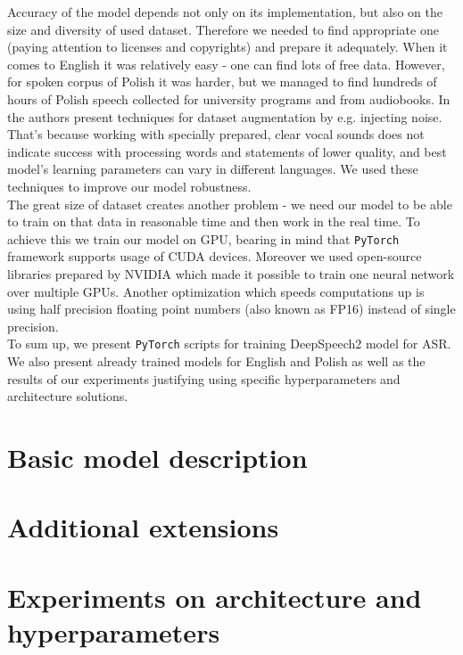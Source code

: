 \documentclass[11pt,a4paper]{article}
\begin{document}
Accuracy of the model depends not only on its implementation, but also on the size and diversity of used dataset. Therefore we needed to find appropriate one (paying attention to licenses and copyrights) and prepare it adequately. When it comes to English it was relatively easy - one can find lots of free data. However, for spoken corpus of Polish it was harder, but we managed to find hundreds of hours of Polish speech collected for university programs and from audiobooks. In \cite{DS1} the authors present techniques for dataset augmentation by e.g. injecting noise. That's because working with specially prepared, clear vocal sounds does not indicate success with processing words and statements of lower quality, and best model's learning parameters can vary in different languages. We used these techniques to improve our model robustness.\\

The great size of dataset creates another problem - we need our model to be able to train on that data in reasonable time and then work in the real time. To achieve this we train our model on GPU, bearing in mind that \texttt{PyTorch} framework supports usage of CUDA devices. Moreover we used open-source libraries prepared by NVIDIA which made it possible to train one neural network over multiple GPUs. Another optimization which speeds computations up is using half precision floating point numbers (also known as FP16) instead of single precision. \\

To sum up, we present \texttt{PyTorch} scripts for training DeepSpeech2 model for ASR. We also present already trained models for English and Polish as well as the results of our experiments justifying using specific hyperparameters and architecture solutions.\\

\newpage
\section{Basic model description}

\newpage
\section{Additional extensions}

\newpage
\section{Experiments on architecture and hyperparameters}
\end{document}
